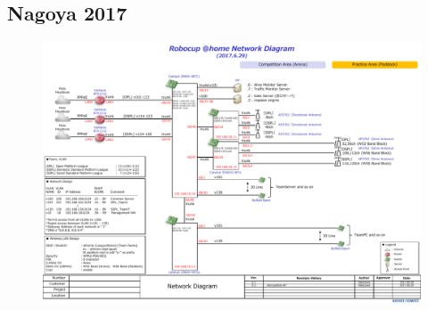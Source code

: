 \begin{itemize}[nosep]
\section{Nagoya 2017}
\begin{figure}[H]
	\includegraphics[width=\columnwidth]{images/nago2017_network.pdf}
\end{figure}

\end{itemize}
